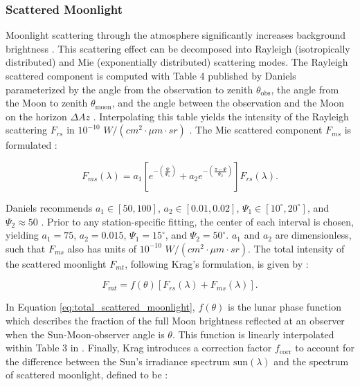\subsubsection{Scattered Moonlight}

Moonlight scattering through the atmosphere significantly increases background brightness \cite{krag2003}. This scattering effect can be decomposed into Rayleigh (isotropically distributed) and Mie (exponentially distributed) scattering modes. The Rayleigh scattered component is computed with Table 4 published by Daniels parameterized by the angle from the observation to zenith $\theta_\mathrm{obs}$, the angle from the Moon to zenith $\theta_\mathrm{moon}$, and the angle between the observation and the Moon on the horizon $\Delta Az$ \cite{daniels1977}. Interpolating this table yields the intensity of the Rayleigh scattering $F_{rs}$ in $10^{-10}$ $W/(cm^2 \cdot \mu m \cdot sr)$ \cite{krag2003}. The Mie scattered component $F_{ms}$ is formulated \cite{krag2003}:

\begin{equation} \label{eq:mie_scattering_moon}
  F_{ms}(\lambda) = a_1 \left[ e^{-\left(\frac{\Psi}{\Psi_1}\right)} + a_2 e^{-\left(\frac{\pi - \Psi}{\Psi_2}\right)} \right] F_{rs}(\lambda).
\end{equation}

Daniels recommends $a_1 \in [50, 100]$, $a_2 \in [0.01, 0.02]$, $\Psi_1 \in [10^\circ, 20^\circ]$, and $\Psi_2 \approx 50$ \cite{daniels1977}. Prior to any station-specific fitting, the center of each interval is chosen, yielding $a_1 = 75$, $a_2 = 0.015$, $\Psi_1 = 15^\circ$, and $\Psi_2 = 50^\circ$. $a_1$ and $a_2$ are dimensionless, such that $F_{ms}$ also has units of $10^{-10}$ $W/(cm^2 \cdot \mu m \cdot sr)$. The total intensity of the scattered moonlight $F_{mt}$, following Krag's formulation, is given by \cite{krag2003}:

\begin{equation} \label{eq:total_scattered_moonlight}
  F_{mt} = f(\theta) \left[ F_{rs}(\lambda) + F_{ms}(\lambda) \right].
\end{equation}

In Equation \ref{eq:total_scattered_moonlight}, $f(\theta)$ is the lunar phase function which describes the fraction of the full Moon brightness reflected at an observer when the Sun-Moon-observer angle is $\theta$. This function is linearly interpolated within Table 3 in \cite{daniels1977}. Finally, Krag introduces a correction factor $f_\mathrm{corr}$ to account for the difference between the Sun's irradiance spectrum $\mathrm{sun}(\lambda)$ and the spectrum of scattered moonlight, defined to be \cite{krag2003}:

